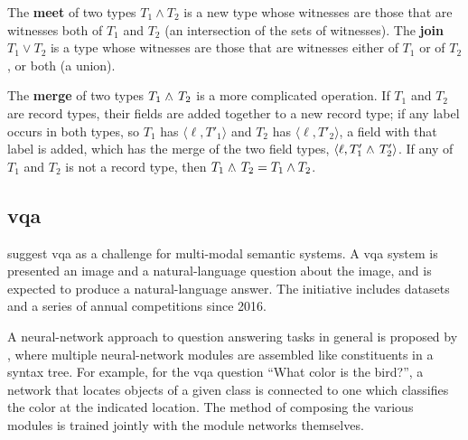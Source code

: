 The \textbf{meet} of two types $T_1 \wedge T_2$ is a new type whose witnesses are those that are witnesses both of $T_1$ and $T_2$ (an intersection of the sets of witnesses).
The \textbf{join} $T_1 \vee T_2$ is a type whose witnesses are those that are witnesses either of $T_1$ or of $T_2$, or both (a union).

The \textbf{merge} of two types $T_1 \mathrel{\wedge_{\mkern-10mu\cdot\mkern6mu}} T_2$ is a more complicated operation.
If $T_1$ and $T_2$ are record types, their fields are added together to a new record type;
if any label occurs in both types, so $T_1$ has $\langle \ell, T'_1\rangle$ and $T_2$ has $\langle \ell, T'_2\rangle$, a field with that label is added, which has the merge of the two field types, $\langle \ell, T'_1 \mathrel{\wedge_{\mkern-10mu\cdot\mkern6mu}} T'_2\rangle$.
If any of $T_1$ and $T_2$ is not a record type, then $T_1 \mathrel{\wedge_{\mkern-10mu\cdot\mkern6mu}} T_2 = T_1 \wedge T_2$.



\subsection{\Acrfull{vqa}}

\cite{AgrawalVQAVisualQuestion2015} suggest \gls{vqa} as a challenge for multi-modal semantic systems.
A \gls{vqa} system is presented an image and a natural-language question about the image, and is expected to produce a natural-language answer.
The initiative includes datasets and a series of annual competitions since 2016.

A neural-network approach to question answering tasks in general is proposed by \cite{AndreasLearningComposeNeural2016}, where multiple neural-network modules are assembled like constituents in a syntax tree.
For example, for the \gls{vqa} question ``What color is the bird?'', a network that locates objects of a given class is connected to one which classifies the color at the indicated location.
The method of composing the various modules is trained jointly with the module networks themselves.



